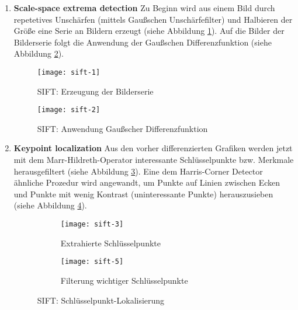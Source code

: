 \begin{enumerate}
    \item \textbf{Scale-space extrema detection}\newline
    Zu Beginn wird aus einem Bild durch repetetives Unschärfen (mittels
    Gaußschen Unschärfefilter) und Halbieren der Größe eine Serie an Bildern
    erzeugt (siehe Abbildung \ref{fig:sift1}). Auf die Bilder der Bilderserie
    folgt die Anwendung der Gaußschen Differenzfunktion (siehe Abbildung
    \ref{fig:sift2}). \parencite{sift-web-scale-space}

    \begin{figure}[H]
        \centering
        \texttt{[image: sift-1]}
        \caption{SIFT: Erzeugung der Bilderserie}
        \label{fig:sift1}
    \end{figure}

    \begin{figure}[H]
        \centering
        \texttt{[image: sift-2]}
        \caption{SIFT: Anwendung Gaußscher Differenzfunktion}
        \label{fig:sift2}
    \end{figure}

    \item \textbf{Keypoint localization}\newline
    Aus den vorher differenzierten Grafiken werden jetzt mit dem
    Marr-Hildreth-Operator interessante Schlüsselpunkte bzw. Merkmale 
    herausgefiltert (siehe Abbildung \ref{fig:sift3}).
    \parencite{sift-web-keypoint} Eine dem Harris-Corner Detector ähnliche
    Prozedur wird angewandt, um Punkte auf Linien zwischen Ecken und Punkte mit
    wenig Kontrast (uninteressante Punkte) herauszusieben (siehe Abbildung 
    \ref{fig:sift5}). \parencite{sift-web-low-contrast}

    \begin{figure}[H]
        \centering
        \begin{subfigure}{.5\textwidth}
          \centering
          \texttt{[image: sift-3]}
          \caption{Extrahierte Schlüsselpunkte}
          \label{fig:sift3}
        \end{subfigure}%
        \begin{subfigure}{.5\textwidth}
          \centering
          \texttt{[image: sift-5]}
          \caption{Filterung wichtiger Schlüsselpunkte}
          \label{fig:sift5}
        \end{subfigure}
        \caption{SIFT: Schlüsselpunkt-Lokalisierung}
        \label{fig:sift-keypoint}
    \end{figure}


\end{enumerate}
